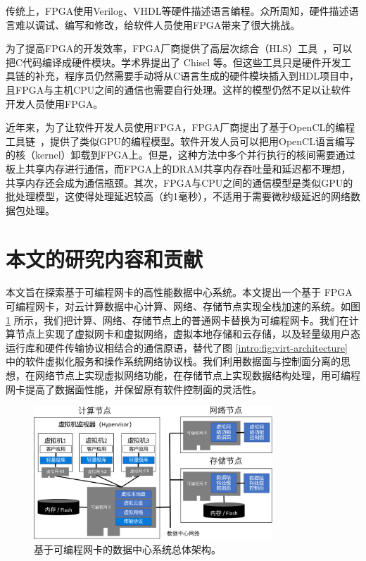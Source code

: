 传统上，FPGA使用Verilog、VHDL等硬件描述语言编程。众所周知，硬件描述语言难以调试、编写和修改，给软件人员使用FPGA带来了很大挑战。

为了提高FPGA的开发效率，FPGA厂商提供了高层次综合（HLS）工具~\cite{vivado,intel-hls}，可以把C代码编译成硬件模块。学术界提出了 Chisel \cite{bachrach2012chisel} 等。但这些工具只是硬件开发工具链的补充，程序员仍然需要手动将从C语言生成的硬件模块插入到HDL项目中，且FPGA与主机CPU之间的通信也需要自行处理。这样的模型仍然不足以让软件开发人员使用FPGA。

近年来，为了让软件开发人员使用FPGA，FPGA厂商提出了基于OpenCL的编程工具链~\cite{aoc,sdaccel}，提供了类似GPU的编程模型。软件开发人员可以把用OpenCL语言编写的核（kernel）卸载到FPGA上。但是，这种方法中多个并行执行的核间需要通过板上共享内存进行通信，而FPGA上的DRAM共享内存吞吐量和延迟都不理想，共享内存还会成为通信瓶颈。其次，FPGA与CPU之间的通信模型是类似GPU的批处理模型，这使得处理延迟较高（约1毫秒），不适用于需要微秒级延迟的网络数据包处理。







\section{本文的研究内容和贡献}


本文旨在探索基于可编程网卡的高性能数据中心系统。本文提出一个基于 FPGA 可编程网卡，对云计算数据中心计算、网络、存储节点实现全栈加速的系统。如图 \ref{intro:fig:accel-arch} 所示，我们把计算、网络、存储节点上的普通网卡替换为可编程网卡。我们在计算节点上实现了虚拟网卡和虚拟网络，虚拟本地存储和云存储，以及轻量级用户态运行库和硬件传输协议相结合的通信原语，替代了图 \ref{intro:fig:virt-architecture} 中的软件虚拟化服务和操作系统网络协议栈。我们利用数据面与控制面分离的思想，在网络节点上实现虚拟网络功能，在存储节点上实现数据结构处理，用可编程网卡提高了数据面性能，并保留原有软件控制面的灵活性。


\begin{figure}[htbp]
	\centering
	\includegraphics[width=0.8\textwidth]{figures/accel_arch.pdf}
	\caption{基于可编程网卡的数据中心系统总体架构。}
	\label{intro:fig:accel-arch}
\end{figure}

